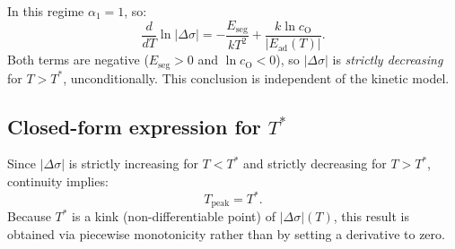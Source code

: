 \documentclass[preprint,12pt,sort&compress]{elsarticle}
\newcommand{\?}{\stackrel{?}{=}}
\providecommand{\DIFaddtex}[1]{{\bf #1}} %
\providecommand{\DIFdeltex}[1]{} %
\providecommand{\DIFaddbegin}{\protect\color{blue}} %
\providecommand{\DIFaddend}{\protect\color{black}} %
\providecommand{\DIFdelbegin}{\protect\color{red}} %
\providecommand{\DIFdelend}{\protect\color{black}} %
\providecommand{\DIFadd}[1]{\texorpdfstring{\DIFaddtex{#1}}{#1}} %
\providecommand{\DIFdel}[1]{\texorpdfstring{\DIFdeltex{#1}}{}} %
\begin{document}
In this regime $\alpha_1 = 1$, so:
\begin{equation}
\frac{d}{dT}\ln|\Delta \sigma| = -\frac{E_\text{seg}}{kT^2} + \frac{k\ln c_\text{O}}{|E_\text{ad}(T)|}.
\label{Eq:App:LogDerivSat}
\end{equation}
Both terms are negative ($E_\text{seg} > 0$ and $\ln c_\text{O} < 0$), so $|\Delta \sigma|$ is \emph{strictly decreasing} for $T > T^*$, unconditionally. This conclusion is independent of the kinetic model.

\DIFdelbegin \subsubsection{\DIFdel{Peak location}}
\addtocounter{subsubsection}{-1}%
\DIFdelend \DIFaddbegin \subsection{\DIFadd{Closed-form expression for }\texorpdfstring{$T^*$}{T*}}
\label{App:Tpeak:Formula}
\DIFaddend 

Since $|\Delta \sigma|$ is strictly increasing for $T < T^*$ and strictly decreasing for $T > T^*$, continuity implies:
\begin{equation}
T_\text{peak} = T^*.
\label{Eq:App:TpeakIsTstar}
\end{equation}
Because $T^*$ is a kink (non-differentiable point) of $|\Delta \sigma|(T)$, this result is obtained via piecewise monotonicity rather than by setting a derivative to zero.

\DIFdelbegin \subsection{\DIFdel{Verification of the monotonicity condition}}
\addtocounter{subsection}{-1}%
\end{document}
